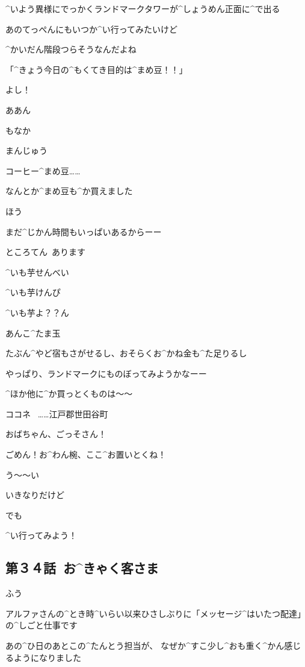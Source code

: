 \Alpha ^{いよう}{異様}にでっかくランドマークタワーが^{しょうめん}{正面}に^{で}{出}る

\page
\Alpha あのてっぺんにもいつか^{い}{行}ってみたいけど

\Alpha ^{かいだん}{階段}つらそうなんだよね

\page
\Alpha 「^{きょう}{今日}の^{もくてき}{目的}は^{まめ}{豆}！！」

\Alpha よし！

\page
\Alpha ああん

\Sign もなか

\Sign まんじゅう

\Alpha コーヒー^{まめ}{豆}……

\Alpha なんとか^{まめ}{豆}も^{か}{買}えました

\Alpha ほう

\page
\Alpha まだ^{じかん}{時間}もいっぱいあるからーー

\Sign ところてん\ あります

\Sign ^{いも}{芋}せんべい

\Sign ^{いも}{芋}けんぴ

\Sign ^{いも}{芋}よ？？ん

\Sign あんこ^{たま}{玉}

\Alpha たぶん^{やど}{宿}もさがせるし、おそらくお^{かね}{金}も^{た}{足}りるし

\page
\Alpha やっぱり、ランドマークにものぼってみようかなーー

\Alpha ^{ほか}{他}に^{か}{買}っとくものは〜〜

\page
\Sign ココネ
\ ……江戸郡世田谷町

\page[23]
\Alpha おばちゃん、ごっそさん！

\Alpha ごめん！お^{わん}{椀}、ここ^{お}{置}いとくね！

\Person う〜〜い

\page
\Alpha いきなりだけど

\Alpha でも

\Alpha ^{い}{行}ってみよう！


\subsection{第３４話\ お^{きゃく}{客}さま}

\page[26]
\Kokone ふう

\Kokone アルファさんの^{とき}{時}^{いらい}{以来}ひさしぶりに「メッセージ^{はいたつ}{配達}」の^{しごと}{仕事}です

\page
\Kokone あの^{ひ}{日}のあとこの^{たんとう}{担当}が、
なぜか^{すこ}{少}し^{おも}{重}く^{かん}{感}じるようになりました

